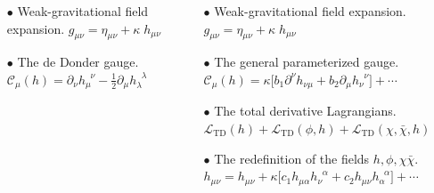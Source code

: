\documentclass[aspectratio=169,usenames,dvipsnames]{beamer}
\begin{document}
\begin{frame}[t]{\centering{}}
\begin{columns}
\begin{column}{0.5\textwidth}
    \begin{itemize}
    \item[$\bullet$] Weak-gravitational field expansion.
      {\scriptsize  $ g_{\mu\nu}=   \eta_{\mu\nu} +  \kappa \; h_{\mu \nu} $}
    \item[$\bullet$] The de Donder gauge.
      {\scriptsize $ \mathcal{C}_{\mu}(h) = \partial_{\nu} h_{\mu}^{\;\;\nu} - \frac{1}{2} \partial_{\mu} h_{\lambda}^{\;\;\lambda} $}
    \end{itemize}
    \vspace{19mm}
  \end{column}
  \begin{column}{0.5\textwidth}
    \centering {}
    \begin{itemize}
    \item[$\bullet$] Weak-gravitational field expansion.
      {\scriptsize $ g_{\mu\nu}=   \eta_{\mu\nu} +  \kappa \; h_{\mu \nu} $}
    \item[$\bullet$] The general parameterized gauge.
      {\scriptsize $\mathcal{C}_{\mu}(h)  =   \kappa \Big [ b_1 \partial^{\nu} h_{ \nu \mu} +b_2
      \partial_{\mu} h_{ \nu}^{\;\;\nu} \Big ]  + \cdots $}
    \item[$\bullet$] The total derivative Lagrangians.
      {\scriptsize $\mathcal{L}_{\text{TD}}(h) + \mathcal{L}_{\text{TD}}(\phi,h) + \mathcal{L}_{\text{TD}} (\chi, \bar{\chi},h) $}
    \item[$\bullet$] The redefinition of the fields $h,\phi,\chi\bar{\chi}$.
      {\scriptsize $ h_{\mu \nu} =  h_{\mu \nu}+\kappa \Big [ c_{1} h_{\mu \alpha}
      h_{\nu}^{\;\; \alpha} +c_{2} h_{\mu \nu} h_{\alpha}^{\;\; \alpha} \Big ]
      + \cdots $}
    \end{itemize}
  \end{column}
\end{columns}
\vspace{100mm}
\end{frame}
\end{document}
